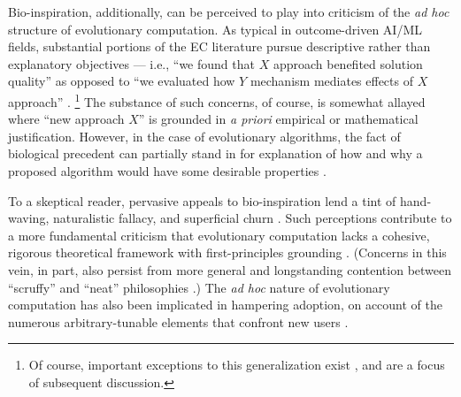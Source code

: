 Bio-inspiration, additionally, can be perceived to play into criticism of the \textit{ad hoc} structure of evolutionary computation.
As typical in outcome-driven AI/ML fields, substantial portions of the EC literature pursue descriptive rather than explanatory objectives --- i.e., ``we found that $X$ approach benefited solution quality'' as opposed to ``we evaluated how $Y$ mechanism mediates effects of $X$ approach'' \citep{lipton2019troubling,hutson2018ai,sculley2018winner,del2019bio}.%
\footnote{%
  Of course, important exceptions to this generalization exist \citep{TODO}, and are a focus of subsequent discussion.
}
The substance of such concerns, of course, is somewhat allayed where ``new approach $X$'' is grounded in \textit{a priori} empirical or mathematical justification.
However, in the case of evolutionary algorithms, the fact of biological precedent can partially stand in for explanation of how and why a proposed algorithm would have some desirable properties \citep{sorensen2015metaheuristics}.

To a skeptical reader, pervasive appeals to bio-inspiration lend a tint of hand-waving, naturalistic fallacy, and superficial churn \citep{wortmann2020does,sorensen2015metaheuristics}.
Such perceptions contribute to a more fundamental criticism that evolutionary computation lacks a cohesive, rigorous theoretical framework with first-principles grounding \citep{TODO}.
(Concerns in this vein, in part, also persist from more general and longstanding contention between ``scruffy'' and ``neat'' philosophies \citep[p. 16]{jones2008artificial} \citep{minsky1991logical}.)
The \textit{ad hoc} nature of evolutionary computation has also been implicated in hampering adoption, on account of the numerous arbitrary-tunable elements that confront new users \citep{oneil2010open}.

